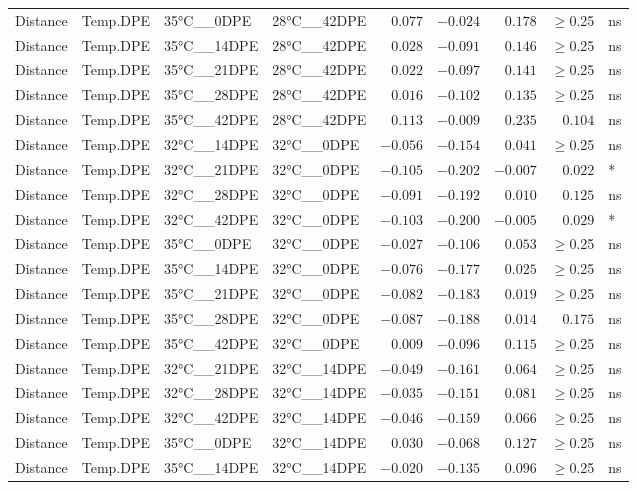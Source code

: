 \documentclass[
]{article}
\begin{document}
\begin{longtable}{llllrrrrl}
Distance & Temp.DPE & 35°C\_\_0DPE & 28°C\_\_42DPE & $0.077$ & $-0.024$ & $0.178$ & $\geq$0.25 & ns \\ 
Distance & Temp.DPE & 35°C\_\_14DPE & 28°C\_\_42DPE & $0.028$ & $-0.091$ & $0.146$ & $\geq$0.25 & ns \\ 
Distance & Temp.DPE & 35°C\_\_21DPE & 28°C\_\_42DPE & $0.022$ & $-0.097$ & $0.141$ & $\geq$0.25 & ns \\ 
Distance & Temp.DPE & 35°C\_\_28DPE & 28°C\_\_42DPE & $0.016$ & $-0.102$ & $0.135$ & $\geq$0.25 & ns \\ 
Distance & Temp.DPE & 35°C\_\_42DPE & 28°C\_\_42DPE & $0.113$ & $-0.009$ & $0.235$ & $0.104$ & ns \\ 
Distance & Temp.DPE & 32°C\_\_14DPE & 32°C\_\_0DPE & $-0.056$ & $-0.154$ & $0.041$ & $\geq$0.25 & ns \\ 
Distance & Temp.DPE & 32°C\_\_21DPE & 32°C\_\_0DPE & $-0.105$ & $-0.202$ & $-0.007$ & $0.022$ & * \\ 
Distance & Temp.DPE & 32°C\_\_28DPE & 32°C\_\_0DPE & $-0.091$ & $-0.192$ & $0.010$ & $0.125$ & ns \\ 
Distance & Temp.DPE & 32°C\_\_42DPE & 32°C\_\_0DPE & $-0.103$ & $-0.200$ & $-0.005$ & $0.029$ & * \\ 
Distance & Temp.DPE & 35°C\_\_0DPE & 32°C\_\_0DPE & $-0.027$ & $-0.106$ & $0.053$ & $\geq$0.25 & ns \\ 
Distance & Temp.DPE & 35°C\_\_14DPE & 32°C\_\_0DPE & $-0.076$ & $-0.177$ & $0.025$ & $\geq$0.25 & ns \\ 
Distance & Temp.DPE & 35°C\_\_21DPE & 32°C\_\_0DPE & $-0.082$ & $-0.183$ & $0.019$ & $\geq$0.25 & ns \\ 
Distance & Temp.DPE & 35°C\_\_28DPE & 32°C\_\_0DPE & $-0.087$ & $-0.188$ & $0.014$ & $0.175$ & ns \\ 
Distance & Temp.DPE & 35°C\_\_42DPE & 32°C\_\_0DPE & $0.009$ & $-0.096$ & $0.115$ & $\geq$0.25 & ns \\ 
Distance & Temp.DPE & 32°C\_\_21DPE & 32°C\_\_14DPE & $-0.049$ & $-0.161$ & $0.064$ & $\geq$0.25 & ns \\ 
Distance & Temp.DPE & 32°C\_\_28DPE & 32°C\_\_14DPE & $-0.035$ & $-0.151$ & $0.081$ & $\geq$0.25 & ns \\ 
Distance & Temp.DPE & 32°C\_\_42DPE & 32°C\_\_14DPE & $-0.046$ & $-0.159$ & $0.066$ & $\geq$0.25 & ns \\ 
Distance & Temp.DPE & 35°C\_\_0DPE & 32°C\_\_14DPE & $0.030$ & $-0.068$ & $0.127$ & $\geq$0.25 & ns \\ 
Distance & Temp.DPE & 35°C\_\_14DPE & 32°C\_\_14DPE & $-0.020$ & $-0.135$ & $0.096$ & $\geq$0.25 & ns \\ 

\end{longtable}
\end{document}
